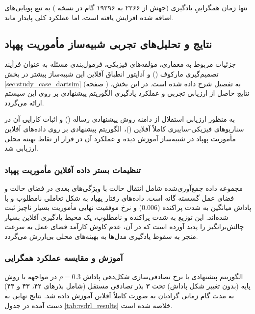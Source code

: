 \documentclass[oneside,openany,phd]{TMU-Thesis}
\begin{document}
تنها زمان همگراییِ یادگیری (جهش از ۲۲۶۶ به ۱۹۲۹۶ گام در نسخه ) به تبع پویایی‌های اضافه شده افزایش یافته است، اما عملکرد کلی پایدار ماند.

\subsection{نتایج و تحلیل‌های تجربی شبیه‌ساز مأموریت پهپاد }
\label{subsec:experimental_results_dartsim}

جزئیات مربوط به معماری، مؤلفه‌های فیزیکی، فرمول‌بندی مسئله به عنوان فرآیند تصمیم‌گیری مارکوف () و آداپتور انطباق آفلاین این شبیه‌ساز پیشتر در بخش \ref{sec:study_case_dartsim} (صفحه \pageref{sec:study_case_dartsim}) به تفصیل شرح داده شده است. در این بخش، نتایج حاصل از ارزیابی تجربی و عملکرد یادگیری الگوریتم پیشنهادی بر روی این سیستم ارائه می‌گردد.

به منظور ارزیابی استقلال از دامنه روش پیشنهادی رساله () و اثبات کارایی آن در سناریوهای فیزیکی-سایبری کاملاً آفلاین ()، الگوریتم پیشنهادی بر روی داده‌های آفلاین مأموریت پهپاد در شبیه‌ساز  آموزش دیده و عملکرد آن در فرار از نقاط بهینه محلی ارزیابی شد.

\subsubsection{تنظیمات بستر داده آفلاین مأموریت پهپاد}
مجموعه داده جمع‌آوری‌شده شامل  انتقال حالت با ویژگی‌های  بعدی در فضای حالت و فضای عمل گسسته گانه است. داده‌های رفتار پهپاد به شکل تعاملی نامطلوب و با پاداش میانگین به شدت پراکنده ($0.006$) و نرخ موفقیت نهایی مأموریت بسیار ناچیز  ثبت شده‌اند. این توزیع به شدت پراکنده و نامطلوب، یک محیط یادگیری آفلاین بسیار چالش‌برانگیز را پدید آورده است که در آن، عدم کاوش کارآمد فضای عمل به سرعت منجر به سقوط یادگیری مدل‌ها به بهینه‌های محلی بی‌ارزش می‌گردد.

\subsubsection{آموزش و مقایسه عملکرد همگرایی}
الگوریتم پیشنهادی  با نرخ تصادفی‌سازی شکل‌دهی پاداش $\rho=0.3$ در مواجهه با روش پایه  (بدون تغییر شکل پاداش) تحت ۳ بذر تصادفی مستقل (شامل بذرهای ۴۲، ۴۳ و ۴۴) به مدت  گام زمانی گرادیان به صورت کاملاً آفلاین آموزش داده شد. نتایج نهایی به دست آمده در جدول \ref{tab:rsdrl_results} خلاصه شده است.
\end{document}
